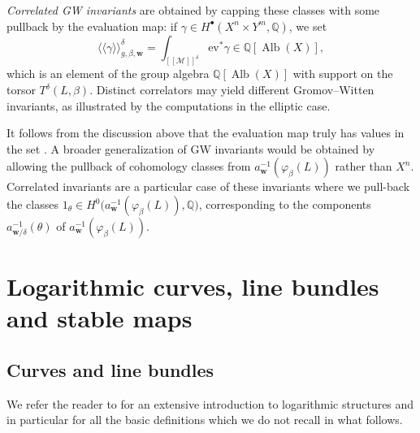 \documentclass[11pt]{article}
\numberwithin{equation}{section}
\newcommand{\fvir}[2]{[\![ #1 ]\!]^{#2}}
\newcommand{\ev}{\mathrm{ev}}
\newcommand{\Alb}{\operatorname{Alb}}
\newcommand{\QQ}{\mathbb{Q}}
\newcommand{\bfw}{ {\boldsymbol w} }
\newcommand{\M}{\mathcal{M}}
\numberwithin{equation}{section}
\theoremstyle{definition}
\begin{document}
\textit{Correlated GW invariants} are obtained by capping these classes with some pullback by the evaluation map: if $\gamma\in H^\bullet(X^n\times Y^m,\QQ)$, we set
\[ \langle\langle\gamma\rangle\rangle^\delta_{g,\beta,\bfw} = \int_{\fvir{\M}{\delta}}\ev^*\gamma \in\QQ[\Alb(X)], \]
which is an element of the group algebra $\QQ[\Alb(X)]$ with support on the torsor $T^\delta(L,\beta)$. Distinct correlators may yield different Gromov--Witten invariants, as illustrated by the computations in the elliptic case.

It follows from the discussion above that the evaluation map truly has values in the set \smash{$a_\bfw^{-1}(\varphi_\beta(L))=\bigsqcup a_{\bfw/\delta}^{-1}(\theta)$}. A broader generalization of GW invariants would be obtained by allowing the pullback of cohomology classes from $a_\bfw^{-1}(\varphi_\beta(L))$ rather than $X^n$. Correlated invariants are a particular case of these invariants where we pull-back the classes $1_\theta\in H^0\bigl(a_\bfw^{-1}(\varphi_\beta(L)),\QQ\bigr)$, corresponding to the components $a_{\bfw/\delta}^{-1}(\theta)$ of $a_{\bfw}^{-1}(\varphi_\beta(L))$.




\section{Logarithmic curves, line bundles and stable maps}
\subsection{Curves and line bundles}
We
refer the reader to \cite{ogus} for an extensive introduction to logarithmic structures and in particular for all the basic definitions which we do not recall in what follows.
\end{document}
